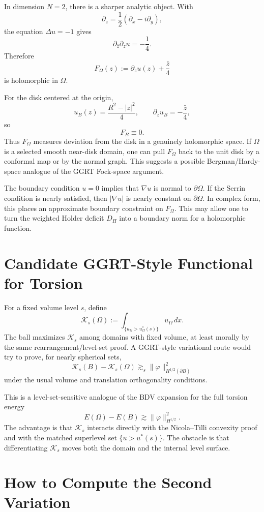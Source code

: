 \documentclass[11pt]{article}
\begin{document}
In dimension \(N=2\), there is a sharper analytic object. With
\[
\partial_z=\frac12(\partial_x-i\partial_y),
\]
the equation \(\Delta u=-1\) gives
\[
\partial_{\bar z}\partial_z u=-\frac14.
\]
Therefore
\[
F_\Omega(z):=\partial_z u(z)+\frac{\bar z}{4}
\]
is holomorphic in \(\Omega\).

For the disk centered at the origin,
\[
u_B(z)=\frac{R^2-|z|^2}{4},
\qquad
\partial_z u_B=-\frac{\bar z}{4},
\]
so
\[
F_B\equiv0.
\]
Thus \(F_\Omega\) measures deviation from the disk in a genuinely holomorphic
space. If \(\Omega\) is a selected smooth near-disk domain, one can pull
\(F_\Omega\) back to the unit disk by a conformal map or by the normal graph.
This suggests a possible Bergman/Hardy-space analogue of the GGRT Fock-space
argument.

The boundary condition \(u=0\) implies that \(\nabla u\) is normal to
\(\partial\Omega\). If the Serrin condition is nearly satisfied, then
\(|\nabla u|\) is nearly constant on \(\partial\Omega\). In complex form, this
places an approximate boundary constraint on \(F_\Omega\). This may allow one
to turn the weighted Holder deficit \(D_H\) into a boundary norm for a
holomorphic function.

\section{Candidate GGRT-Style Functional for Torsion}

For a fixed volume level \(s\), define
\[
\mathcal K_s(\Omega)
:=
\int_{\{u_\Omega>u_\Omega^*(s)\}}u_\Omega\,dx.
\]
The ball maximizes \(\mathcal K_s\) among domains with fixed volume, at least
morally by the same rearrangement/level-set proof. A GGRT-style variational
route would try to prove, for nearly spherical sets,
\[
\mathcal K_s(B)-\mathcal K_s(\Omega)
\gtrsim_s
\|\varphi\|_{H^{1/2}(\partial B)}^2
\]
under the usual volume and translation orthogonality conditions.

This is a level-set-sensitive analogue of the BDV expansion for the full
torsion energy
\[
E(\Omega)-E(B)\gtrsim \|\varphi\|_{H^{1/2}}^2.
\]
The advantage is that \(\mathcal K_s\) interacts directly with the
Nicola--Tilli convexity proof and with the matched superlevel set
\(\{u>u^*(s)\}\). The obstacle is that differentiating \(\mathcal K_s\) moves
both the domain and the internal level surface.

\section{How to Compute the Second Variation}
\end{document}
